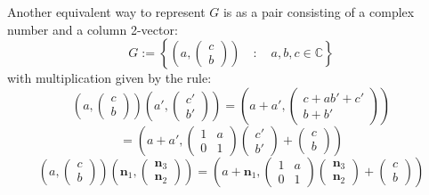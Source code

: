 \documentclass[A4paper,11pt]{amsart}
\newcommand{\C}{\mathbb{C}}
\theoremstyle{definition}
\theoremstyle{named}
\begin{document}
 Another equivalent way to represent $G$ is as a pair consisting of a complex number and a column 2-vector:
 \[
 G:=\left\{\left(a,\begin{pmatrix}c\\b\end{pmatrix}\right) \quad:\quad a, b, c \in\C \right\}
 \]
 with multiplication given by the rule:
  \begin{equation}\left(a,\begin{pmatrix}c\\b\end{pmatrix}\right)
 \left(a',\begin{pmatrix}c'\\b'\end{pmatrix}\right)=\left(a+a',\begin{pmatrix}c+ab'+c'\\b+b'\end{pmatrix}\right)
  \end{equation}
 \[
 =\left(a+a',\begin{pmatrix}1&a\\0&1\end{pmatrix}\begin{pmatrix}c'\\b'\end{pmatrix}+\begin{pmatrix}c\\b\end{pmatrix}\right)
\]
 \begin{equation}\left(a,\begin{pmatrix}c\\b\end{pmatrix}\right)
 \left(\mathbf{n}_1,\begin{pmatrix}\mathbf{n}_3\\\mathbf{n}_2\end{pmatrix}\right)=
 \left(a+\mathbf{n}_1,\begin{pmatrix}1&a\\0&1\end{pmatrix}\begin{pmatrix}\mathbf{n}_3\\\mathbf{n}_2\end{pmatrix}+\begin{pmatrix}c\\b\end{pmatrix}\right)
 \end{equation}
\end{document}
